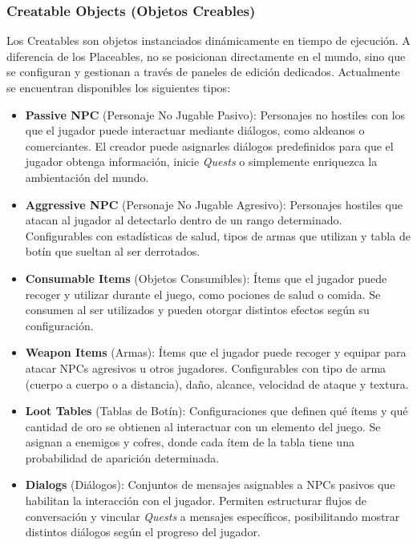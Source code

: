 \subsubsection{Creatable Objects (Objetos Creables)}

Los Creatables son objetos instanciados dinámicamente en tiempo de ejecución. A diferencia de los Placeables, no se 
posicionan directamente en el mundo, sino que se configuran y gestionan a través de paneles de edición dedicados.
Actualmente se encuentran disponibles los siguientes tipos:

\begin{itemize}
  \item \textbf{Passive NPC} (Personaje No Jugable Pasivo): Personajes no hostiles con los que el jugador puede 
  interactuar mediante diálogos, como aldeanos o comerciantes. El creador puede asignarles diálogos predefinidos 
  para que el jugador obtenga información, inicie \textit{Quests} o simplemente enriquezca la ambientación del mundo.

  \item \textbf{Aggressive NPC} (Personaje No Jugable Agresivo): Personajes hostiles que atacan al jugador al 
  detectarlo dentro de un rango determinado. Configurables con estadísticas de salud, tipos de armas que utilizan 
  y tabla de botín que sueltan al ser derrotados.

  \item \textbf{Consumable Items} (Objetos Consumibles): Ítems que el jugador puede recoger y utilizar durante 
  el juego, como pociones de salud o comida. Se consumen al ser utilizados y pueden otorgar distintos efectos 
  según su configuración.

  \item \textbf{Weapon Items} (Armas): Ítems que el jugador puede recoger y equipar para atacar NPCs agresivos 
  u otros jugadores. Configurables con tipo de arma (cuerpo a cuerpo o a distancia), daño, alcance, velocidad 
  de ataque y textura.

  \item \textbf{Loot Tables} (Tablas de Botín): Configuraciones que definen qué ítems y qué cantidad de oro 
  se obtienen al interactuar con un elemento del juego. Se asignan a enemigos y cofres, donde cada ítem de la 
  tabla tiene una probabilidad de aparición determinada.

  \item \textbf{Dialogs} (Diálogos): Conjuntos de mensajes asignables a NPCs pasivos que habilitan la 
  interacción con el jugador. Permiten estructurar flujos de conversación y vincular \textit{Quests} a mensajes 
  específicos, posibilitando mostrar distintos diálogos según el progreso del jugador.


\end{itemize}
